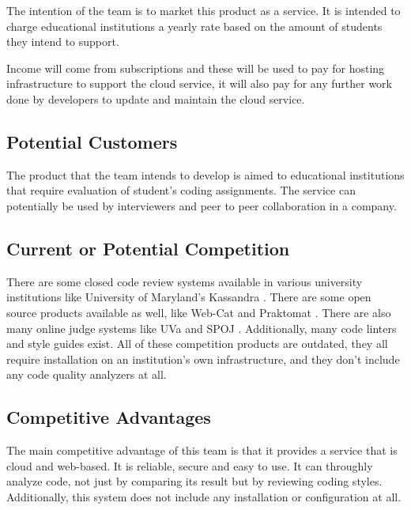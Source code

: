 
The intention of the team is to market this product as a service. It is intended to charge
educational institutions a yearly rate based on the amount of students they
intend to support.

Income will come from subscriptions and these will be used to pay for hosting
infrastructure to support the cloud service, it will also pay for any further
work done by developers to update and maintain the cloud service.

\subsection{Potential Customers}

The product that the team intends to develop is aimed to educational institutions that
require evaluation of student's coding assignments. The service can potentially
be used by interviewers and peer to peer collaboration in a company.

\subsection{Current or Potential Competition}

There are some closed code review systems available in various university
institutions like University of Maryland's Kassandra \cite{Matt1994}. There are
some open source products available as well, like Web-Cat \cite{WebCat} and
Praktomat \cite{Pracktomat}. There are also many online judge systems like UVa
\cite{UVA} and SPOJ \cite{SPOJ}. Additionally, many code linters and style
guides exist. All of these competition products are outdated, they all require
installation on an institution's own infrastructure, and they don't include any
code quality analyzers at all.

\subsection{Competitive Advantages}

The main competitive advantage of this team is that it provides a service that is cloud and
web-based. It is reliable, secure and easy to use. It can throughly analyze
code, not just by comparing its result but by reviewing coding styles.
Additionally, this system does not include any installation or configuration at
all.





